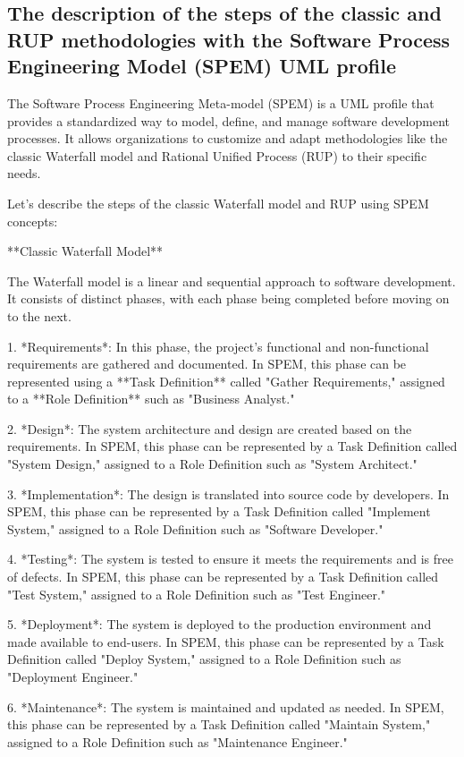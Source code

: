 \documentclass{article}
\begin{document}
\subsection{The description of the steps of the classic and RUP methodologies with the Software Process Engineering Model (SPEM) UML profile}

The Software Process Engineering Meta-model (SPEM) is a UML profile that provides a standardized way to model, define, and manage software development processes. It allows organizations to customize and adapt methodologies like the classic Waterfall model and Rational Unified Process (RUP) to their specific needs.

Let's describe the steps of the classic Waterfall model and RUP using SPEM concepts:

**Classic Waterfall Model**

The Waterfall model is a linear and sequential approach to software development. It consists of distinct phases, with each phase being completed before moving on to the next.

1. *Requirements*: In this phase, the project's functional and non-functional requirements are gathered and documented. In SPEM, this phase can be represented using a **Task Definition** called "Gather Requirements," assigned to a **Role Definition** such as "Business Analyst."

2. *Design*: The system architecture and design are created based on the requirements. In SPEM, this phase can be represented by a Task Definition called "System Design," assigned to a Role Definition such as "System Architect."

3. *Implementation*: The design is translated into source code by developers. In SPEM, this phase can be represented by a Task Definition called "Implement System," assigned to a Role Definition such as "Software Developer."

4. *Testing*: The system is tested to ensure it meets the requirements and is free of defects. In SPEM, this phase can be represented by a Task Definition called "Test System," assigned to a Role Definition such as "Test Engineer."

5. *Deployment*: The system is deployed to the production environment and made available to end-users. In SPEM, this phase can be represented by a Task Definition called "Deploy System," assigned to a Role Definition such as "Deployment Engineer."

6. *Maintenance*: The system is maintained and updated as needed. In SPEM, this phase can be represented by a Task Definition called "Maintain System," assigned to a Role Definition such as "Maintenance Engineer."
\end{document}
